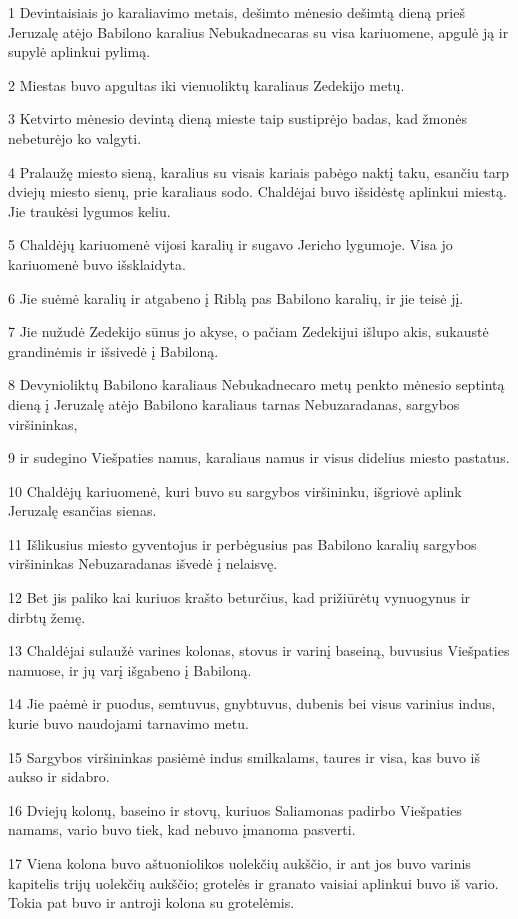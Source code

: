\par 1 Devintaisiais jo karaliavimo metais, dešimto mėnesio dešimtą dieną prieš Jeruzalę atėjo Babilono karalius Nebukadnecaras su visa kariuomene, apgulė ją ir supylė aplinkui pylimą. 
\par 2 Miestas buvo apgultas iki vienuoliktų karaliaus Zedekijo metų. 
\par 3 Ketvirto mėnesio devintą dieną mieste taip sustiprėjo badas, kad žmonės nebeturėjo ko valgyti. 
\par 4 Pralaužę miesto sieną, karalius su visais kariais pabėgo naktį taku, esančiu tarp dviejų miesto sienų, prie karaliaus sodo. Chaldėjai buvo išsidėstę aplinkui miestą. Jie traukėsi lygumos keliu. 
\par 5 Chaldėjų kariuomenė vijosi karalių ir sugavo Jericho lygumoje. Visa jo kariuomenė buvo išsklaidyta. 
\par 6 Jie suėmė karalių ir atgabeno į Riblą pas Babilono karalių, ir jie teisė jį. 
\par 7 Jie nužudė Zedekijo sūnus jo akyse, o pačiam Zedekijui išlupo akis, sukaustė grandinėmis ir išsivedė į Babiloną. 
\par 8 Devynioliktų Babilono karaliaus Nebukadnecaro metų penkto mėnesio septintą dieną į Jeruzalę atėjo Babilono karaliaus tarnas Nebuzaradanas, sargybos viršininkas, 
\par 9 ir sudegino Viešpaties namus, karaliaus namus ir visus didelius miesto pastatus. 
\par 10 Chaldėjų kariuomenė, kuri buvo su sargybos viršininku, išgriovė aplink Jeruzalę esančias sienas. 
\par 11 Išlikusius miesto gyventojus ir perbėgusius pas Babilono karalių sargybos viršininkas Nebuzaradanas išvedė į nelaisvę. 
\par 12 Bet jis paliko kai kuriuos krašto beturčius, kad prižiūrėtų vynuogynus ir dirbtų žemę. 
\par 13 Chaldėjai sulaužė varines kolonas, stovus ir varinį baseiną, buvusius Viešpaties namuose, ir jų varį išgabeno į Babiloną. 
\par 14 Jie paėmė ir puodus, semtuvus, gnybtuvus, dubenis bei visus varinius indus, kurie buvo naudojami tarnavimo metu. 
\par 15 Sargybos viršininkas pasiėmė indus smilkalams, taures ir visa, kas buvo iš aukso ir sidabro. 
\par 16 Dviejų kolonų, baseino ir stovų, kuriuos Saliamonas padirbo Viešpaties namams, vario buvo tiek, kad nebuvo įmanoma pasverti. 
\par 17 Viena kolona buvo aštuoniolikos uolekčių aukščio, ir ant jos buvo varinis kapitelis trijų uolekčių aukščio; grotelės ir granato vaisiai aplinkui buvo iš vario. Tokia pat buvo ir antroji kolona su grotelėmis. 
